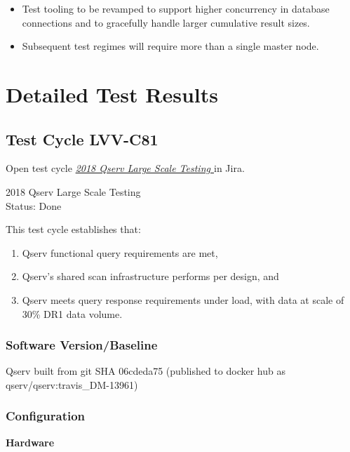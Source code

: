 \documentclass[DM,lsstdraft,STR,toc]{lsstdoc}
\providecommand{\tightlist}{
  \setlength{\itemsep}{0pt}\setlength{\parskip}{0pt}}
\begin{document}
\begin{itemize}
\tightlist
\item
  Test tooling to be revamped to support higher concurrency in database
  connections and to gracefully handle larger cumulative result sizes.
\item
  Subsequent test regimes will require more than a single master node.
\end{itemize}


\newpage
\section{Detailed Test Results}
\label{sect:detailedtestresults}


  \subsection{Test Cycle LVV-C81 }

Open test cycle {\it \href{https://jira.lsstcorp.org/secure/Tests.jspa#/testrun/LVV-C81}{2018 Qserv Large Scale Testing
}} in Jira.

  2018 Qserv Large Scale Testing
\\
  Status: Done

  This test cycle establishes that:\\

\begin{enumerate}
\tightlist
\item
  Qserv functional query requirements are met,~
\item
  Qserv's shared scan infrastructure performs per design, and
\item
  Qserv meets query response requirements under load, with data at scale
  of 30\% DR1 data volume.
\end{enumerate}


  \subsubsection{Software Version/Baseline}
    Qserv built from git SHA 06cdeda75 (published to docker hub as
qserv/qserv:travis\_DM-13961)


  \subsubsection{Configuration}
    \textbf{Hardware}\\
\end{document}
